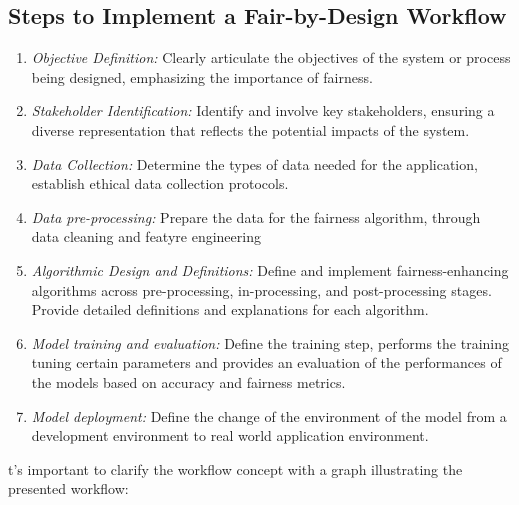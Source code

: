 \documentclass[12pt,a4paper,openright,twoside]{book}
\begin{document}
\subsection{Steps to Implement a Fair-by-Design Workflow}
\label{subsection:steps}

\begin{enumerate}

    \item \emph{Objective Definition:} Clearly articulate the objectives of the system or process being designed, emphasizing the importance of fairness.

    \item \emph{Stakeholder Identification:} Identify and involve key stakeholders, ensuring a diverse representation that reflects the potential impacts of the system.

    \item \emph{Data Collection:} Determine the types of data needed for the application, establish ethical data collection protocols.

    \item \emph{Data pre-processing:} Prepare the data for the fairness algorithm, through data cleaning and featyre engineering
    
    \item \emph{Algorithmic Design and Definitions:} Define and implement fairness-enhancing algorithms across pre-processing, in-processing, and post-processing stages. Provide detailed definitions and explanations for each algorithm.

    \item \emph{Model training and evaluation:} Define the training step, performs the training tuning certain parameters and provides an evaluation of the performances of the models based on accuracy and fairness metrics.

    \item \emph{Model deployment:} Define the change of the environment of the model from a development environment to real world application environment.

\end{enumerate}

t's important to clarify the workflow concept with a graph illustrating the presented workflow:
\end{document}
